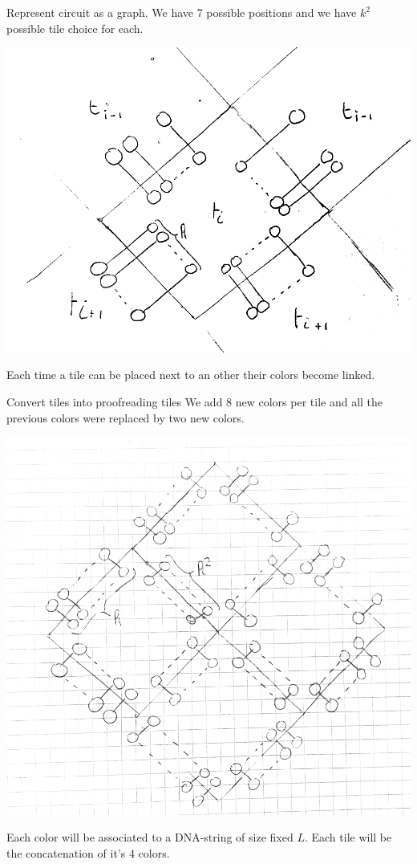 \documentclass{beamer}
\begin{document}
\begin{frame}{Represent circuit as a graph.}
	We have 7 possible positions and we have $k^2$ possible tile choice for each.
	
	\begin{center}
		\includegraphics[scale=0.18]{tograph}
	\end{center}
	Each time a tile can be placed next to an other their colors become linked.
\end{frame}

\begin{frame}{Convert tiles into proofreading tiles}
	We add 8 new colors per tile and all the previous colors were replaced by two new colors.
	\begin{center}
		\includegraphics[scale=0.12]{proofreading}
	\end{center}
	\pause
	Each color will be associated to a DNA-string of size fixed $L$.
	Each tile will be the concatenation of it's 4 colors.
\end{frame}
\end{document}

